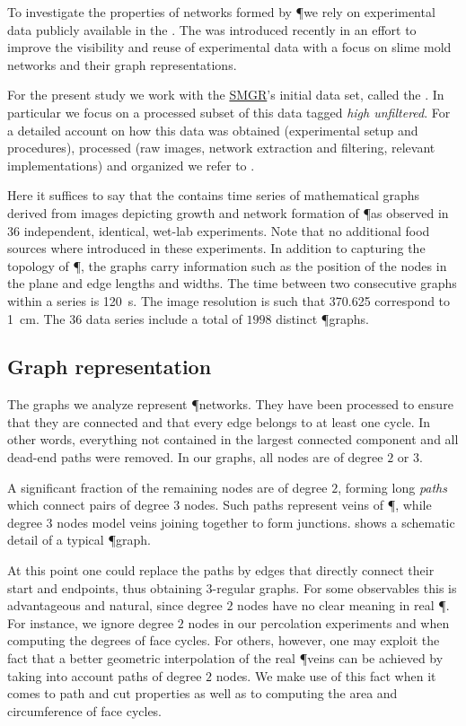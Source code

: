 		To investigate the properties of networks formed by \P we rely on experimental data publicly available in the \SMGR. The \SMGR was introduced recently in an effort to improve the visibility and reuse of experimental data with a focus on slime mold networks and their graph representations.
	
		For the present study we work with the \href{http://smgr.mpi-inf.mpg.de}{SMGR}'s initial data set, called the \data. In particular we focus on a processed subset of this data tagged \emph{high unfiltered}. For a detailed account on how this data was obtained (experimental setup and procedures), processed (raw images, network extraction and filtering, relevant implementations) and organized we refer to . 

		Here it suffices to say that the \data contains time series of mathematical graphs derived from images depicting growth and network formation of \P as observed in $36$ independent, identical, wet-lab experiments. Note that no additional food sources where introduced in these experiments. In addition to capturing the topology of \P, the graphs carry information such as the position of the nodes in the plane and edge lengths and widths. The time between two consecutive graphs within a series is \SI{120}{\second}. The image resolution is such that \SI{370.625}{\pixel} correspond to \SI{1}{\centi\metre}. The $36$ data series include a total of $1998$ distinct \P graphs. 

	\subsection{Graph representation}

		The graphs we analyze represent \P networks. They have been processed to ensure that they are connected and that every edge belongs to at least one cycle. In other words, everything not contained in the largest connected component and all dead-end paths were removed. In our graphs, all nodes are of degree $2$ or $3$.

		A significant fraction of the remaining nodes are of degree $2$, forming long \emph{paths} which connect pairs of degree $3$ nodes. Such paths represent veins of \P, while degree $3$ nodes model veins joining together to form junctions.  shows a schematic detail of a typical \P graph.

		At this point one could replace the paths by edges that directly connect their start and endpoints, thus obtaining $3$-regular graphs. For some observables this is advantageous and natural, since degree $2$ nodes have no clear meaning in real \P. For instance, we ignore degree $2$ nodes in our percolation experiments and when computing the degrees of face cycles. For others, however, one may exploit the fact that a better geometric interpolation of the real \P veins can be achieved by taking into account paths of degree $2$ nodes. We make use of this fact when it comes to path and cut properties as well as to computing the area and circumference of face cycles.

